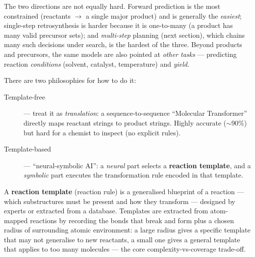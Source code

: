 \documentclass[11pt, oneside]{book}
\begin{document}
The two directions are not equally hard. Forward prediction is the most constrained
(reactants $\to$ a single major product) and is generally the \emph{easiest};
single-step retrosynthesis is harder because it is one-to-many (a product has many
valid precursor sets); and \emph{multi-step} planning (next section), which chains
many such decisions under search, is the hardest of the three. Beyond products and
precursors, the same models are also pointed at \emph{other tasks} --- predicting
reaction \emph{conditions} (solvent, catalyst, temperature) and \emph{yield}.

There are two philosophies for how to do it:

\begin{description}
  \item[Template-free] --- treat it as \emph{translation}: a sequence-to-sequence
        ``Molecular Transformer'' directly maps reactant strings to product strings.
        Highly accurate ($\sim$90\%) but hard for a chemist to inspect (no explicit
        rules).
  \item[Template-based] --- ``neural-symbolic AI'': a \emph{neural} part selects a
        \textbf{reaction template}, and a \emph{symbolic} part executes the
        transformation rule encoded in that template.
\end{description}

A \textbf{reaction template} (reaction rule) is a generalised blueprint of a
reaction --- which substructures must be present and how they transform --- designed
by experts or extracted from a database. Templates are extracted from atom-mapped
reactions by recording the bonds that break and form plus a chosen radius of
surrounding atomic environment: a large radius gives a specific template that may not
generalise to new reactants, a small one gives a general template that applies to too
many molecules --- the core complexity-vs-coverage trade-off.
\end{document}
